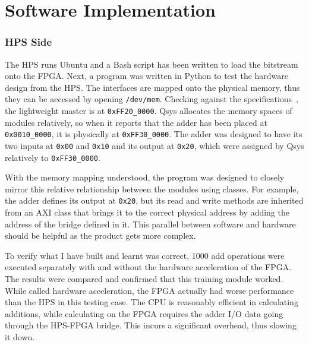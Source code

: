 \section{Software Implementation}

\subsubsection{HPS Side}
The HPS runs Ubuntu and a Bash script has been written to load the bitstream
onto the FPGA.
Next, a program was written in Python to test the hardware design from the HPS.
The interfaces are mapped onto the physical memory, thus they can be accessed
by opening \texttt{/dev/mem}.
Checking against the specifications~\cite{Altera6}, the lightweight master is
at \texttt{0xFF20\_0000}.
Qsys allocates the memory spaces of modules relatively, so when it reports
that the adder has been placed at \texttt{0x0010\_0000}, it is physically at
\texttt{0xFF30\_0000}.
The adder was designed to have its two inputs at \texttt{0x00} and
\texttt{0x10} and its output at \texttt{0x20}, which were assigned by Qsys
relatively to \texttt{0xFF30\_0000}.

With the memory mapping understood, the program was designed to closely
mirror this relative relationship between the modules using classes.
For example, the adder defines its output at \texttt{0x20}, but its read and
write methods are inherited from an AXI class that brings it to the
correct physical address by adding the address of the bridge defined in it.
This parallel between software and hardware should be helpful as the product
gets more complex.

To verify what I have built and learnt was correct, 1000 add operations were
executed separately with and without the hardware acceleration of the FPGA.
The results were compared and confirmed that this training module worked.
While called hardware acceleration, the FPGA actually had worse performance
than the HPS in this testing case.
The CPU is reasonably efficient in calculating additions, while calculating
on the FPGA requires the adder I/O data going through the HPS-FPGA bridge.
This incurs a significant overhead, thus slowing it down.
